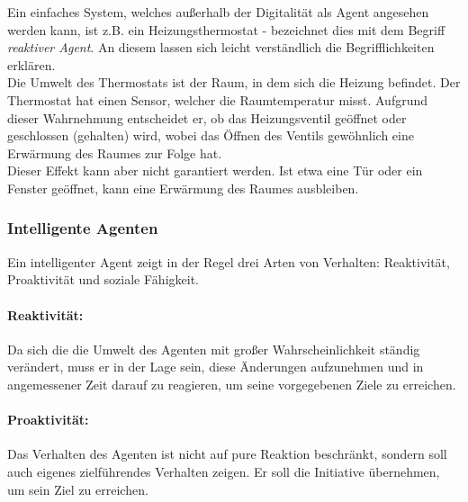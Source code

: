 Ein einfaches System, welches außerhalb der Digitalität als Agent angesehen werden kann, ist z.B. ein Heizungsthermostat - \cite{artificialintelligence} bezeichnet dies mit dem Begriff \textit{reaktiver Agent}.
An diesem lassen sich leicht verständlich die Begrifflichkeiten erklären.
\\
Die Umwelt des Thermostats ist der Raum, in dem sich die Heizung befindet.
Der Thermostat hat einen Sensor, welcher die Raumtemperatur misst.
Aufgrund dieser Wahrnehmung entscheidet er, ob das Heizungsventil geöffnet oder geschlossen (gehalten) wird, wobei das Öffnen des Ventils gewöhnlich eine Erwärmung des Raumes zur Folge hat.
\\
Dieser Effekt kann aber nicht garantiert werden.
Ist etwa eine Tür oder ein Fenster geöffnet, kann eine Erwärmung des Raumes ausbleiben.




\subsubsection{Intelligente Agenten}
\label{sec:intelligente-agenten}

Ein intelligenter Agent zeigt in der Regel drei Arten von Verhalten: Reaktivität, Proaktivität und soziale Fähigkeit.

\paragraph*{Reaktivität:} 
Da sich die die Umwelt des Agenten  mit großer Wahrscheinlichkeit ständig verändert, muss er in der Lage sein, diese Änderungen aufzunehmen und in angemessener Zeit darauf zu reagieren, um seine vorgegebenen Ziele zu erreichen.

\paragraph*{Proaktivität:} 
Das Verhalten des Agenten ist nicht auf pure Reaktion beschränkt, sondern soll auch eigenes zielführendes Verhalten zeigen. 
Er soll die Initiative übernehmen, um sein Ziel zu erreichen.

